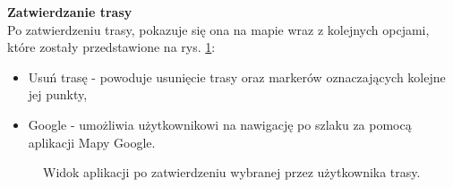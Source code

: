 \noindent
\textbf{Zatwierdzanie trasy} \\
\indent Po zatwierdzeniu trasy, pokazuje się ona na mapie wraz z kolejnych opcjami, które zostały przedstawione na rys. \ref{widok:zatwierdztrase}:
\begin{itemize}
    \item Usuń trasę - powoduje usunięcie trasy oraz markerów oznaczających kolejne jej punkty,
    \item Google - umożliwia użytkownikowi na nawigację po szlaku za pomocą aplikacji Mapy Google.\\
\end{itemize}

\begin{figure}[H]
    \centering
    \caption{Widok aplikacji po zatwierdzeniu wybranej przez użytkownika trasy.}
    \label{widok:zatwierdztrase}
\end{figure}

